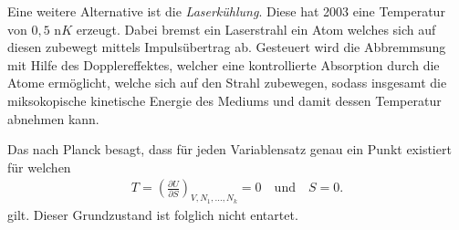 Eine weitere Alternative ist die \emph{Laserkühlung}. Diese hat 2003 eine Temperatur von $0,5$ n$K$ erzeugt. Dabei bremst ein Laserstrahl ein Atom welches sich auf diesen zubewegt mittels Impulsübertrag ab. Gesteuert wird die Abbremmsung mit Hilfe des Dopplereffektes, welcher eine kontrollierte Absorption durch die Atome ermöglicht, welche sich auf den Strahl zubewegen, sodass insgesamt die miksokopische kinetische Energie des Mediums und damit dessen Temperatur abnehmen kann.

\begin{summary}
    Das  nach Planck besagt, dass für jeden Variablensatz genau ein Punkt existiert für welchen 
    \begin{align*}
        T=\left(\frac{\partial U}{\partial S}\right)_{V,N_1,...,N_k}=0\quad \mathrm{und}\quad S=0.
    \end{align*}
    gilt. Dieser Grundzustand ist folglich nicht entartet. 
    

\end{summary}
